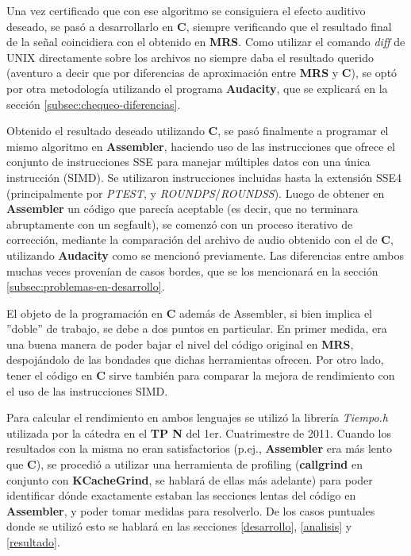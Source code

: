 \documentclass[a4paper,spanish,12pt]{article}
\begin{document}
Una vez certificado que con ese algoritmo se consiguiera el efecto auditivo deseado, se pasó a desarrollarlo en \textbf{C}, siempre verificando que el resultado final de la señal coincidiera con el obtenido en \textbf{MRS}. Como utilizar el comando \textit{diff} de UNIX directamente sobre los archivos no siempre daba el resultado querido (aventuro a decir que por diferencias de aproximación entre \textbf{MRS} y \textbf{C}), se optó por otra metodología utilizando el programa \textbf{Audacity}, que se explicará en la sección \ref{subsec:chequeo-diferencias}.\vspace{\baselineskip}

Obtenido el resultado deseado utilizando \textbf{C}, se pasó finalmente a programar el mismo algoritmo en \textbf{Assembler}, haciendo uso de las instrucciones que ofrece el conjunto de instrucciones SSE para manejar múltiples datos con una única instrucción (SIMD). Se utilizaron instrucciones incluidas hasta la extensión SSE4 (principalmente por \textit{PTEST}, y \textit{ROUNDPS}/\textit{ROUNDSS}). Luego de obtener en \textbf{Assembler} un código que parecía aceptable (es decir, que no terminara abruptamente con un segfault), se comenzó con un proceso iterativo de corrección, mediante la comparación del archivo de audio obtenido con el de \textbf{C}, utilizando \textbf{Audacity} como se mencionó previamente. Las diferencias entre ambos muchas veces provenían de casos bordes, que se los mencionará en la sección \ref{subsec:problemas-en-desarrollo}.\vspace{\baselineskip}

El objeto de la programación en \textbf{C} además de Assembler, si bien implica el ''doble'' de trabajo, se debe a dos puntos en particular. En primer medida, era una buena manera de poder bajar el nivel del código original en \textbf{MRS}, despojándolo de las bondades que dichas herramientas ofrecen. Por otro lado, tener el código en \textbf{C} sirve también para comparar la mejora de rendimiento con el uso de las instrucciones SIMD. \vspace{\baselineskip}

Para calcular el rendimiento en ambos lenguajes se utilizó la librería \textit{Tiempo.h} utilizada por la cátedra en el \textbf{TP N} del 1er. Cuatrimestre de 2011. Cuando los resultados con la misma no eran satisfactorios (p.ej., \textbf{Assembler} era más lento que \textbf{C}), se procedió a utilizar una herramienta de profiling (\textbf{callgrind} en conjunto con \textbf{KCacheGrind}, se hablará de ellas más adelante) para poder identificar dónde exactamente estaban las secciones lentas del código en \textbf{Assembler}, y poder tomar medidas para resolverlo. De los casos puntuales donde se utilizó esto se hablará en las secciones \ref{desarrollo}, \ref{analisis} y \ref{resultado}.\vspace{\baselineskip}
\end{document}
